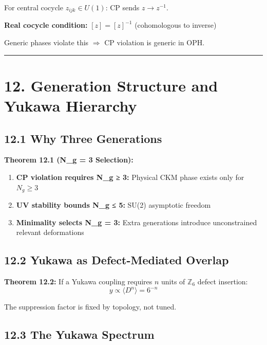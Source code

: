 For central cocycle \(z_{ijk} \in U(1)\): CP sends \(z \to z^{-1}\).

\textbf{Real cocycle condition:} \([z] = [z]^{-1}\) (cohomologous to inverse)

Generic phases violate this \(\Rightarrow\) CP violation is generic in OPH.

\begin{center}\rule{0.5\linewidth}{0.5pt}\end{center}

\section{12. Generation Structure and Yukawa Hierarchy}\label{12-generation-structure-and-yukawa-hierarchy}

\subsection{12.1 Why Three Generations}\label{121-why-three-generations}

\textbf{Theorem 12.1 (N\_g = 3 Selection):}

\begin{enumerate}
\def\labelenumi{\arabic{enumi}.}
\tightlist
\item
  \textbf{CP violation requires N\_g ≥ 3:} Physical CKM phase exists only for \(N_g \geq 3\)
\item
  \textbf{UV stability bounds N\_g ≤ 5:} SU(2) asymptotic freedom
\item
  \textbf{Minimality selects N\_g = 3:} Extra generations introduce unconstrained relevant deformations
\end{enumerate}

\subsection{12.2 Yukawa as Defect-Mediated Overlap}\label{122-yukawa-as-defect-mediated-overlap}

\textbf{Theorem 12.2:} If a Yukawa coupling requires \(n\) units of \(\mathbb{Z}_6\) defect insertion: \[y \propto \langle D^n \rangle = 6^{-n}\]

The suppression factor is fixed by topology, not tuned.

\subsection{12.3 The Yukawa Spectrum}\label{123-the-yukawa-spectrum}

